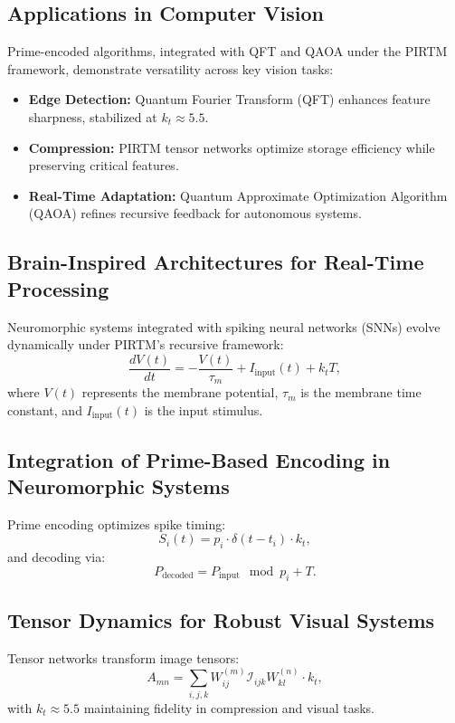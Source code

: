 \documentclass{article}
\theoremstyle{plain}
\begin{document}
\subsection{Applications in Computer Vision}
Prime-encoded algorithms, integrated with QFT and QAOA under the PIRTM framework, demonstrate versatility across key vision tasks:

\begin{itemize}
    \item \textbf{Edge Detection:} Quantum Fourier Transform (QFT) enhances feature sharpness, stabilized at \( k_t \approx 5.5 \).
    \item \textbf{Compression:} PIRTM tensor networks optimize storage efficiency while preserving critical features.
    \item \textbf{Real-Time Adaptation:} Quantum Approximate Optimization Algorithm (QAOA) refines recursive feedback for autonomous systems.
\end{itemize}

\subsection{Brain-Inspired Architectures for Real-Time Processing}
Neuromorphic systems integrated with spiking neural networks (SNNs) evolve dynamically under PIRTM’s recursive framework:
\begin{equation}
\frac{dV(t)}{dt} = -\frac{V(t)}{\tau_m} + I_\text{input}(t) + k_t T,
\end{equation}
where \( V(t) \) represents the membrane potential, \( \tau_m \) is the membrane time constant, and \( I_\text{input}(t) \) is the input stimulus.

\subsection{Integration of Prime-Based Encoding in Neuromorphic Systems}
Prime encoding optimizes spike timing:
\begin{equation}
S_i(t) = p_i \cdot \delta(t - t_i) \cdot k_t,
\end{equation}
and decoding via:
\begin{equation}
P_\text{decoded} = P_\text{input} \mod p_i + T.
\end{equation}

\subsection{Tensor Dynamics for Robust Visual Systems}
Tensor networks transform image tensors:
\begin{equation}
A_{mn} = \sum_{i,j,k} W_{ij}^{(m)} \mathcal{I}_{ijk} W_{kl}^{(n)} \cdot k_t,
\end{equation}
with \( k_t \approx 5.5 \) maintaining fidelity in compression and visual tasks.
\end{document}
